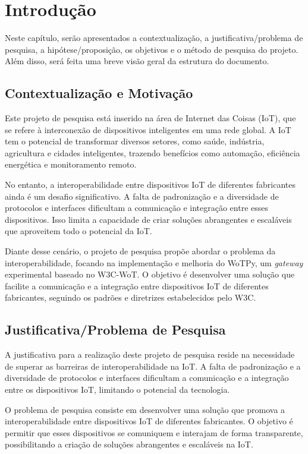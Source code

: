 \chapter{Introdução}

Neste capítulo, serão apresentados a contextualização, a justificativa/problema de pesquisa, a hipótese/proposição, os objetivos e o método de pesquisa do projeto. Além disso, será feita uma breve visão geral da estrutura do documento.

\section{Contextualização e Motivação}

Este projeto de pesquisa está inserido na área de Internet das Coisas (IoT), que se refere à interconexão de dispositivos inteligentes em uma rede global. A IoT tem o potencial de transformar diversos setores, como saúde, indústria, agricultura e cidades inteligentes, trazendo benefícios como automação, eficiência energética e monitoramento remoto.

No entanto, a interoperabilidade entre dispositivos IoT de diferentes fabricantes ainda é um desafio significativo. A falta de padronização e a diversidade de protocolos e interfaces dificultam a comunicação e integração entre esses dispositivos. Isso limita a capacidade de criar soluções abrangentes e escaláveis que aproveitem todo o potencial da IoT.

Diante desse cenário, o projeto de pesquisa propõe abordar o problema da interoperabilidade, focando na implementação e melhoria do WoTPy, um \textit{gateway} experimental baseado no W3C-WoT. O objetivo é desenvolver uma solução que facilite a comunicação e a integração entre dispositivos IoT de diferentes fabricantes, seguindo os padrões e diretrizes estabelecidos pelo W3C.

\section{Justificativa/Problema de Pesquisa}

A justificativa para a realização deste projeto de pesquisa reside na necessidade de superar as barreiras de interoperabilidade na IoT. A falta de padronização e a diversidade de protocolos e interfaces dificultam a comunicação e a integração entre os dispositivos IoT, limitando o potencial da tecnologia.

O problema de pesquisa consiste em desenvolver uma solução que promova a interoperabilidade entre dispositivos IoT de diferentes fabricantes. O objetivo é permitir que esses dispositivos se comuniquem e interajam de forma transparente, possibilitando a criação de soluções abrangentes e escaláveis na IoT.

